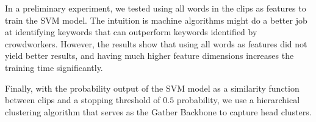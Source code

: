 

In a preliminary experiment, we tested using all words in the clips as features to train
the SVM model. The intuition is machine algorithms might do a better job at identifying
keywords that can outperform keywords identified by crowdworkers. However, the results
show that using all words as features did not yield better results, and having much
higher feature dimensions increases the training time significantly.


Finally, with the probability output of the SVM model 
as a similarity function between clips and a stopping threshold of $0.5$ probability,
we use a hierarchical clustering algorithm 
that serves as the Gather Backbone to capture head clusters. 




